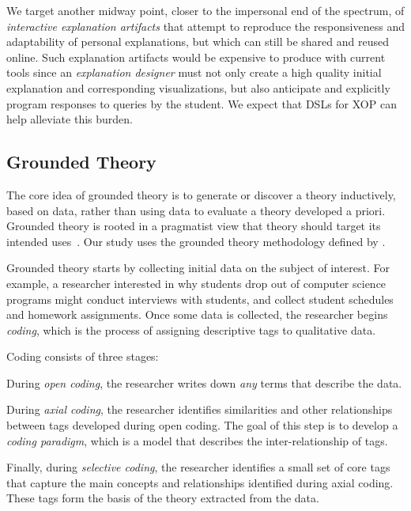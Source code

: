 \documentclass[sigconf]{acmart}
\begin{document}
We target another midway point, closer to the impersonal end of the spectrum,
of \emph{interactive explanation artifacts} that attempt to reproduce the
responsiveness and adaptability of personal explanations, but which can still
be shared and reused online. Such explanation artifacts would be expensive to
produce with current tools since an \emph{explanation designer} must not only
create a high quality initial explanation and corresponding visualizations, but
also anticipate and explicitly program responses to queries by the student.
%
We expect that DSLs for XOP can help alleviate this burden.


\subsection{Grounded Theory}
\label{sec:back:gt}

The core idea of grounded theory is to generate or discover a theory
inductively, based on data, rather than using data to evaluate a theory
developed a priori. 
%
Grounded theory is rooted in a pragmatist view that theory should target its
intended uses~\cite{Strauss67discoveryof}.
%
%
%
%
Our study uses the grounded theory methodology defined by
\citet{corbin2014basics}.


Grounded theory starts by collecting initial data on the subject of interest.
For example, a researcher interested in why students drop out of computer
science programs might conduct interviews with students, and collect student
schedules and homework assignments.
%
Once some data is collected, the researcher begins \emph{coding}, which is the
process of assigning descriptive tags to qualitative data.


Coding consists of three stages:
%
\begin{enumerate*}
%
\item During \emph{open coding}, the researcher writes down \emph{any} terms
that describe the data.
%
\item During \emph{axial coding}, the researcher identifies similarities and
other relationships between tags developed during open coding. The goal of this
step is to develop a \emph{coding paradigm}, which is a model that describes
the inter-relationship of tags.
%
\item Finally, during \emph{selective coding}, the researcher identifies a
small set of core tags that capture the main concepts and relationships
identified during axial coding. These tags form the basis of the theory
extracted from the data.
%
\end{enumerate*}
\end{document}
